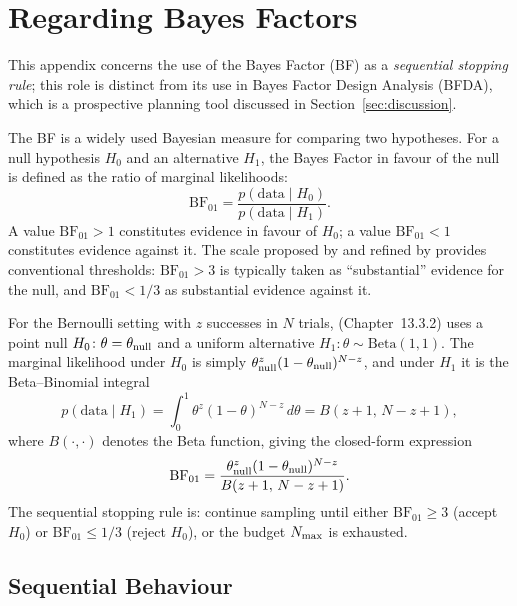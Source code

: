 \section{Regarding Bayes Factors}\label{app:bayes_factors}

This appendix concerns the use of the Bayes Factor (BF) as a \textit{sequential
stopping rule}; this role is distinct from its use in Bayes Factor Design Analysis
(BFDA), which is a prospective planning tool discussed in Section~\ref{sec:discussion}.

The BF is a widely used Bayesian measure for comparing two hypotheses.
For a null hypothesis $H_0$ and an alternative $H_1$, the Bayes Factor in favour of
the null is defined as the ratio of marginal likelihoods:
\begin{equation}\label{eq:bf_definition}
  \mathrm{BF}_{01} = \frac{p(\mathrm{data} \mid H_0)}{p(\mathrm{data} \mid H_1)}.
\end{equation}
A value $\mathrm{BF}_{01} > 1$ constitutes evidence in favour of $H_0$; a value
$\mathrm{BF}_{01} < 1$ constitutes evidence against it.
The scale proposed by \citet{jeffreys1961} and refined by \citet{kassraftery1995}
provides conventional thresholds: $\mathrm{BF}_{01} > 3$ is typically taken as
``substantial'' evidence for the null, and $\mathrm{BF}_{01} < 1/3$ as substantial
evidence against it.

For the Bernoulli setting with $z$ successes in $N$ trials, \citet{kruschke2015doing}
(Chapter~13.3.2) uses a point null $H_0\colon \theta = \theta_{\rm null}$ and a uniform
alternative $H_1\colon \theta \sim \mathrm{Beta}(1, 1)$.  The marginal likelihood under
$H_0$ is simply $\theta_{\rm null}^{z}(1-\theta_{\rm null})^{N-z}$, and under $H_1$ it
is the Beta--Binomial integral
\begin{equation}\label{eq:bf_h1_marginal}
  p(\mathrm{data} \mid H_1)
  = \int_0^1 \theta^{z}(1-\theta)^{N-z}\,d\theta
  = B(z+1,\, N-z+1),
\end{equation}
where $B(\cdot,\cdot)$ denotes the Beta function, giving the closed-form expression
\begin{equation}\label{eq:bf_bernoulli}
  \mathrm{BF}_{01}
  = \frac{\theta_{\rm null}^{z}(1-\theta_{\rm null})^{N-z}}{B(z+1,\, N-z+1)}.
\end{equation}
The sequential stopping rule is: continue sampling until either
$\mathrm{BF}_{01} \geq 3$ (accept $H_0$) or $\mathrm{BF}_{01} \leq 1/3$ (reject $H_0$),
or the budget $N_{\rm max}$ is exhausted.

\subsection*{Sequential Behaviour}


